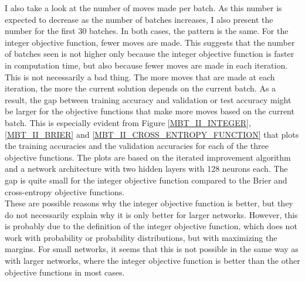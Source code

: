 \noindent I also take a look at the number of moves made per batch. As this number is expected to decrease as the number of batches increases, I also present the number for the first 30 batches. In both cases, the pattern is the same. For the integer objective function, fewer moves are made. This suggests that the number of batches seen is not higher only because the integer objective function is faster in computation time, but also because fewer moves are made in each iteration. This is not necessarily a bad thing. The more moves that are made at each iteration, the more the current solution depends on the current batch. As a result, the gap between training accuracy and validation or test accuracy might be larger for the objective functions that make more moves based on the current batch. This is especially evident from Figure \ref{MBT_II_INTEGER}, \ref{MBT_II_BRIER} and \ref{MBT_II_CROSS_ENTROPY_FUNCTION} that plots the training accuracies and the validation accuracies for each of the three objective functions. The plots are based on the iterated improvement algorithm and a network architecture with two hidden layers with 128 neurons each. The gap is quite small for the integer objective function compared to the Brier and cross-entropy objective functions. \\

\noindent These are possible reasons why the integer objective function is better, but they do not necessarily explain why it is only better for larger networks. However, this is probably due to the definition of the integer objective function, which does not work with probability or probability distributions, but with maximizing the margins. For small networks, it seems that this is not possible in the same way as with larger networks, where the integer objective function is better than the other objective functions in most cases. 

